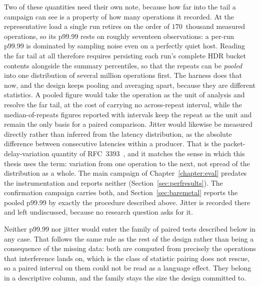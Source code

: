 \documentclass[english,oneside,a4paper,censored,csm,software-track-2020]{HYthesisML}
\begin{document}
Two of these quantities need their own note, because how far into the tail a campaign can see
is a property of how many operations it recorded. At the representative load a single run
retires on the order of $170$~thousand measured operations, so its p99.99 rests on roughly
seventeen observations: a per-run p99.99 is dominated by sampling noise even on a perfectly
quiet host. Reading the far tail at all therefore requires persisting each run's complete HDR
bucket contents alongside the summary percentiles, so that the repeats can be \emph{pooled} into
one distribution of several million operations first. The harness does that now, and the design
keeps pooling and averaging apart, because they are different statistics. A pooled figure would
take the operation as the unit of analysis and resolve the far tail, at the cost of carrying no
across-repeat interval, while the median-of-repeats figures reported with intervals keep the
repeat as the unit and remain the only basis for a paired comparison. Jitter would likewise be
measured directly rather than inferred from the latency distribution, as the absolute difference
between consecutive latencies within a producer. That is the packet-delay-variation quantity of
RFC~3393~\cite{rfc3393}, and it matches the sense in which this thesis uses the term: variation
from one operation to the next, not spread of the distribution as a whole. The main campaign of
Chapter~\ref{chapter:eval} predates the instrumentation and reports neither
(Section~\ref{sec:perfresults}). The confirmation campaign carries both, and
Section~\ref{sec:baremetal} reports the pooled p99.99 by exactly the procedure described above.
Jitter is recorded there and left undiscussed, because no research question asks for it.

Neither p99.99 nor jitter would enter the family of paired tests described below in any case.
That follows the same rule as the rest of the design rather than being a consequence of the
missing data: both are computed from precisely the operations that interference lands on, which
is the class of statistic pairing does not rescue, so a paired interval on them could not be
read as a language effect. They belong in a descriptive column, and the family stays the size
the design committed to.
\end{document}

